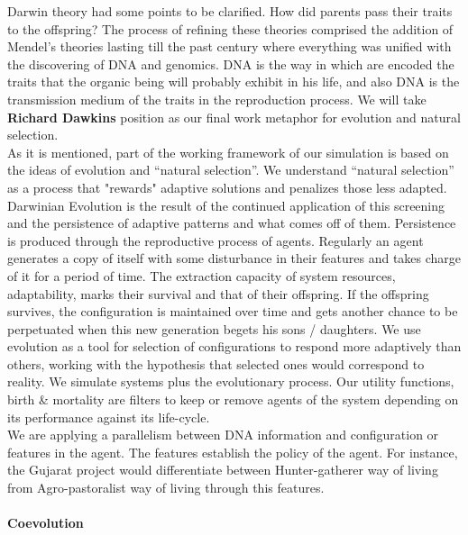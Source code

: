 \documentclass[11pt,oneside,a4paper,openright]{report}
\begin{document}
Darwin theory had some points to be clarified. How did parents pass their traits to the offspring?
The process of refining these theories comprised the addition of Mendel's theories lasting till 
the past century where everything was unified with the discovering of DNA and genomics. DNA is the 
way in which are encoded the traits that the organic being will probably exhibit in his life, and 
also DNA is the transmission medium of the traits in the reproduction process. We will take \textbf{Richard Dawkins} 
position as our final work metaphor for evolution and natural selection\cite{Dawkins1990}.\\ 
As it is mentioned, part of the working framework of our simulation is based on the ideas of evolution and ``natural selection''. We understand ``natural selection'' as a process that "rewards" adaptive solutions and penalizes those less adapted. Darwinian Evolution is the result of the continued application of this screening and the persistence of adaptive patterns and what comes off of them. Persistence is produced through the reproductive process of agents. Regularly an agent generates a copy of itself with some disturbance in their features and takes charge of it for a period of time. The extraction capacity of system resources, adaptability,  marks their survival and that of their offspring. If the offspring survives, the configuration is maintained over time and gets another chance to be perpetuated when this new generation begets his sons / daughters. We use evolution as a tool for selection of configurations to respond more adaptively than others, working with the hypothesis that selected ones would correspond to reality. We simulate systems plus the evolutionary process. Our utility functions, birth \& mortality are filters to keep or remove agents of the system depending on its performance against its life-cycle.\\ 
We are applying a parallelism between DNA information and configuration or features in the agent. The features establish
the policy of the agent. For instance, the Gujarat project would differentiate between Hunter-gatherer way of living from Agro-pastoralist way of living through this features.
\paragraph{Coevolution}
\end{document}
